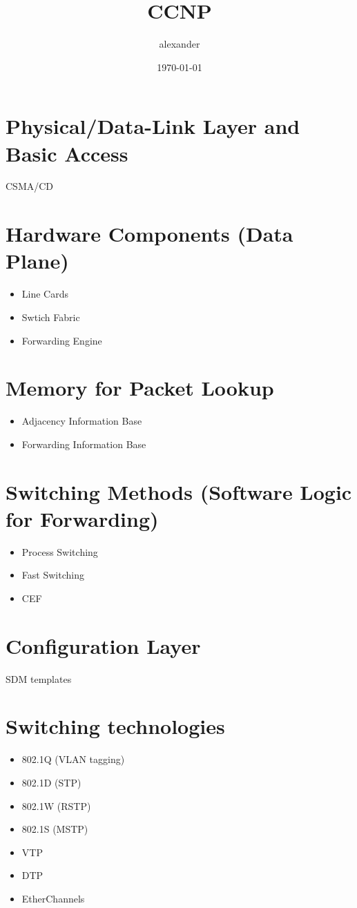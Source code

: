 \documentclass{article}
\title{CCNP}
\author{alexander}
\date{\today}
\begin{document}
\maketitle

\section*{Physical/Data-Link Layer and Basic Access}
CSMA/CD

\section*{Hardware Components (Data Plane)}
	\begin{itemize}
		\item Line Cards
		\item Swtich Fabric
		\item Forwarding Engine
	\end{itemize}

\section*{Memory for Packet Lookup}
	\begin{itemize}
		\item Adjacency Information Base
		\item Forwarding Information Base
	\end{itemize}

\section*{Switching Methods (Software Logic for Forwarding)}
	\begin{itemize}
		\item Process Switching
		\item Fast Switching
		\item CEF
	\end{itemize}

\section*{Configuration Layer}
SDM templates

\section*{Switching technologies}
	\begin{itemize}
		\item 802.1Q (VLAN tagging)
		\item 802.1D (STP)
		\item 802.1W (RSTP)
		\item 802.1S (MSTP)
		\item VTP
		\item DTP
		\item EtherChannels
	\end{itemize}
\end{document}
